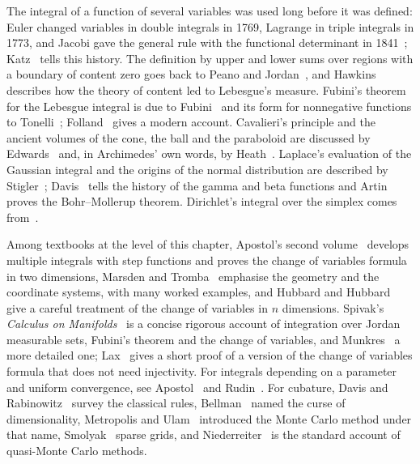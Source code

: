 \chapternotes

The integral of a function of several variables was used long before it was defined: Euler changed variables in double integrals in 1769, Lagrange in triple integrals in 1773, and Jacobi gave the general rule with the functional determinant in 1841~\cite{jacobi1841}; Katz~\cite{katz1982} tells this history. The definition by upper and lower sums over regions with a boundary of content zero goes back to Peano and Jordan~\cite{jordan1893}, and Hawkins~\cite{hawkins1975} describes how the theory of content led to Lebesgue's measure. Fubini's theorem for the Lebesgue integral is due to Fubini~\cite{fubini1907} and its form for nonnegative functions to Tonelli~\cite{tonelli1909}; Folland~\cite{folland1999} gives a modern account. Cavalieri's principle and the ancient volumes of the cone, the ball and the paraboloid are discussed by Edwards~\cite{edwards1979} and, in Archimedes' own words, by Heath~\cite{heath1897archimedes}. Laplace's evaluation of the Gaussian integral and the origins of the normal distribution are described by Stigler~\cite{stigler1986}; Davis~\cite{davis1959gamma} tells the history of the gamma and beta functions and Artin~\cite{artin1964gamma} proves the Bohr--Mollerup theorem. Dirichlet's integral over the simplex comes from~\cite{dirichlet1839}.

Among textbooks at the level of this chapter, Apostol's second volume~\cite{apostol1969calculus} develops multiple integrals with step functions and proves the change of variables formula in two dimensions, Marsden and Tromba~\cite{marsden2012vector} emphasise the geometry and the coordinate systems, with many worked examples, and Hubbard and Hubbard~\cite{hubbard2015vector} give a careful treatment of the change of variables in $n$ dimensions. Spivak's \emph{Calculus on Manifolds}~\cite{spivak1965manifolds} is a concise rigorous account of integration over Jordan measurable sets, Fubini's theorem and the change of variables, and Munkres~\cite{munkres1991} a more detailed one; Lax~\cite{lax1999} gives a short proof of a version of the change of variables formula that does not need injectivity. For integrals depending on a parameter and uniform convergence, see Apostol~\cite{apostol1969calculus} and Rudin~\cite{rudin1976}. For cubature, Davis and Rabinowitz~\cite{davis1984} survey the classical rules, Bellman~\cite{bellman1957} named the curse of dimensionality, Metropolis and Ulam~\cite{metropolis1949} introduced the Monte Carlo method under that name, Smolyak~\cite{smolyak1963} sparse grids, and Niederreiter~\cite{niederreiter1992} is the standard account of quasi-Monte Carlo methods.

\chapterreferences
